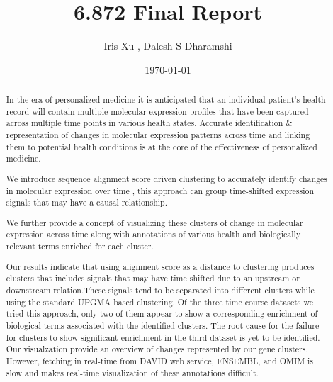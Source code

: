 \documentclass[aps,prd,final,onecolumn,a4paper,10pt]{revtex4}
\begin{document}
\title{6.872 Final Report}
\author{Iris Xu , Dalesh S Dharamshi }	
\date{\today} 

\begin{abstract}
\noindent
  In the era of personalized medicine it is anticipated that an individual patient's health record will contain multiple molecular expression profiles that have been captured across multiple time points in various health states. Accurate identification \& representation of changes in molecular expression patterns across time and linking them to potential health conditions is at the core of the effectiveness of personalized medicine. 
  
  We introduce sequence alignment score driven clustering to accurately identify changes in molecular expression over time , this approach can group time-shifted expression signals that may have a causal relationship.
  
  We further provide a concept of visualizing these clusters of change in molecular expression across time along with annotations of various health and biologically relevant terms enriched for each cluster.
  
  Our results indicate that using alignment score as a distance to clustering produces clusters that includes signals that may have time shifted due to an upstream or downstream relation.These signals tend to be separated into different clusters while using the standard UPGMA based clustering. 
  Of the three time course datasets we tried this approach, only two of them appear to show a corresponding enrichment of biological terms associated with the identified clusters. The root cause for the failure for clusters to show significant enrichment in the third dataset is yet to be identified.
  Our visualzation provide an overview of changes represented by our gene clusters. However, fetching in real-time from DAVID web service, ENSEMBL, and OMIM is slow and makes real-time visualization of these annotations difficult.
  
\end{abstract}

\maketitle

\pagestyle{myheadings}
\thispagestyle{empty}

\end{document}
